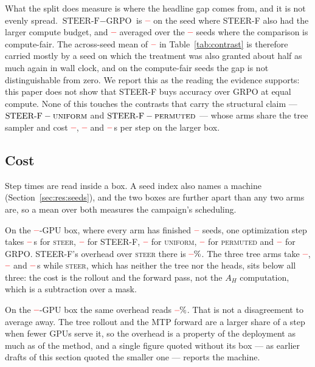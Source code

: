 \documentclass[11pt]{article}
\newcommand{\AH}{A_{H}}
\providecommand{\PENDING}{\textcolor{red}{\textbf{--}}}
\newcommand{\num}[1]{\ifcsname #1\endcsname\csname #1\endcsname\else\PENDING\fi}
\begin{document}
What the split does measure is where the headline gap comes from, and it is not
evenly spread. $\text{STEER-F} - \text{GRPO}$ is $\num{Cmlosignedgrpoacc}$ on the
seed where STEER-F also had the larger compute budget, and $\num{Cmhisignedgrpoacc}$
averaged over the $\num{Cmhin}$ seeds where the comparison is compute-fair. The
across-seed mean of $\num{Csignedgrpoacc}$ in Table~\ref{tab:contrast} is
therefore carried mostly by a seed on which the treatment was also granted about
half as much again in wall clock, and on the compute-fair seeds the gap is not
distinguishable from zero. We report this as the reading the evidence supports:
this paper does not show that STEER-F buys accuracy over GRPO at equal compute.
None of this touches the contrasts that carry the structural claim ---
$\text{STEER-F} - \textsc{uniform}$ and $\text{STEER-F} - \textsc{permuted}$ ---
whose arms share the tree sampler and cost $\num{Costsignedhi}$,
$\num{Costuniformhi}$ and $\num{Costpermutedhi}$\,s per step on the larger box.

\subsection{Cost}
\label{sec:res:cost}

Step times are read inside a box. A seed index also names a machine
(Section~\ref{sec:res:seeds}), and the two boxes are further apart than any two arms
are, so a mean over both measures the campaign's scheduling.

On the $\num{Costgpushi}$-GPU box, where every arm has finished
$\num{Costnsignedhi}$ seeds, one optimization step takes $\num{Coststeerhi}$\,s for
\textsc{steer}, $\num{Costsignedhi}$ for STEER-F, $\num{Costuniformhi}$ for
\textsc{uniform}, $\num{Costpermutedhi}$ for \textsc{permuted} and
$\num{Costgrpohi}$ for GRPO. STEER-F's overhead over \textsc{steer} there is
$\num{Costoverheadhi}\%$. The three tree arms take $\num{Costsignedhi}$, $\num{Costuniformhi}$ and
$\num{Costpermutedhi}$\,s while \textsc{steer}, which has neither the tree nor the
heads, sits below all three: the cost is the rollout and the forward
pass, not the $\AH$ computation, which is a subtraction over a mask.

On the $\num{Costgpuslo}$-GPU box the same overhead reads
$\num{Costoverheadlo}\%$. That is not a disagreement to average away. The tree
rollout and the MTP forward are a larger share of a step when fewer GPUs serve it, so
the overhead is a property of the deployment as much as of the method, and a single
figure quoted without its box --- as earlier drafts of this section quoted the smaller
one --- reports the machine.
\end{document}
